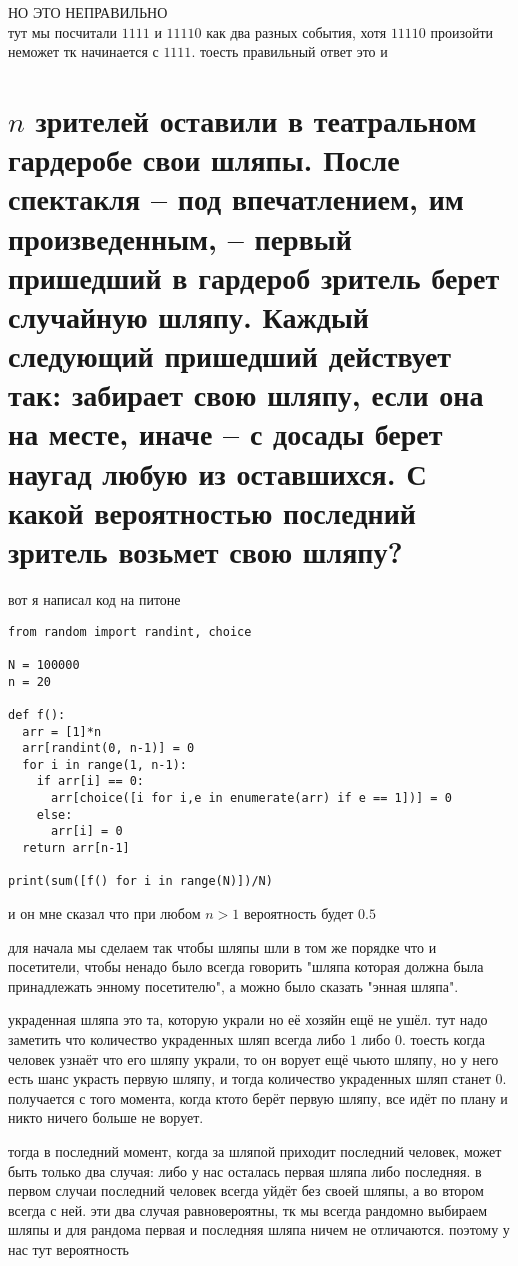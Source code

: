 \documentclass{article}
\begin{document}
  НО ЭТО НЕПРАВИЛЬНО \\
  тут мы посчитали $1111$ и $11110$ как два разных события, хотя $11110$ произойти неможет тк начинается с $1111$.
  тоесть правильный ответ это  и 

  \section{$n$ зрителей оставили в театральном гардеробе свои шляпы. После спектакля -- под впечатлением, им произведенным, -- первый пришедший в гардероб зритель берет случайную шляпу. Каждый следующий пришедший действует так: забирает свою шляпу, если она на месте, иначе -- с досады берет наугад любую из оставшихся. С какой вероятностью последний зритель возьмет свою шляпу?}
  вот я написал код на питоне
  \begin{Verbatim}[frame=single]
from random import randint, choice

N = 100000
n = 20

def f():
  arr = [1]*n
  arr[randint(0, n-1)] = 0
  for i in range(1, n-1):
    if arr[i] == 0:
      arr[choice([i for i,e in enumerate(arr) if e == 1])] = 0
    else:
      arr[i] = 0
  return arr[n-1]

print(sum([f() for i in range(N)])/N)
  \end{Verbatim}
  и он мне сказал что при любом $n>1$ вероятность будет $0.5$

  для начала мы сделаем так чтобы шляпы шли в том же порядке что и посетители,
  чтобы ненадо было всегда говорить "{}шляпа которая должна была принадлежать энному посетителю"{},
  а можно было сказать "{}энная шляпа"{}.

  украденная шляпа это та, которую украли но её хозяйн ещё не ушёл.
  тут надо заметить что количество украденных шляп всегда либо $1$ либо $0$.
  тоесть когда человек узнаёт что его шляпу украли, то он ворует ещё чьюто шляпу, но у него есть шанс украсть первую шляпу,
  и тогда количество украденных шляп станет $0$.
  получается с того момента, когда ктото берёт первую шляпу, все идёт по плану и никто ничего больше не ворует.

  тогда в последний момент, когда за шляпой приходит последний человек, может быть только два случая:
  либо у нас осталась первая шляпа либо последняя.
  в первом случаи последний человек всегда уйдёт без своей шляпы, а во втором всегда с ней.
  эти два случая равновероятны, тк мы всегда рандомно выбираем шляпы и для рандома первая и последняя шляпа ничем не отличаются.
  поэтому у нас тут вероятность 

\end{document}
